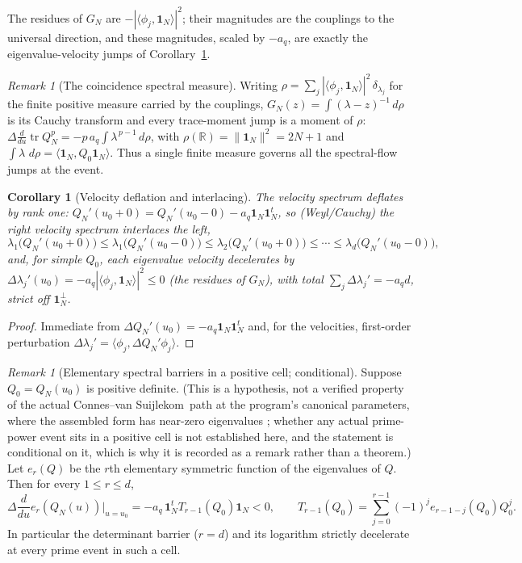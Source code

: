 \documentclass[11pt]{article}
\theoremstyle{plain}
\newtheorem{corollary}[theorem]{Corollary}
\theoremstyle{definition}
\theoremstyle{remark}
\newtheorem{remark}[theorem]{Remark}
\newcommand{\R}{\mathbb R}
\newcommand{\cvs}{Connes--van Suijlekom}
\newcommand{\dd}{\,d}
\newcommand{\one}{\mathbf 1}
\begin{document}
The residues of $G_N$ are $-|\langle\phi_j,\one_N\rangle|^2$; their magnitudes are
the couplings to the universal direction, and these magnitudes, scaled by
$-a_q$, are exactly
the eigenvalue-velocity jumps of Corollary~\ref{cor:deflation}.

\begin{remark}[The coincidence spectral measure]
Writing $\rho=\sum_j|\langle\phi_j,\one_N\rangle|^2\,\delta_{\lambda_j}$ for the
finite positive measure carried by the couplings, $G_N(z)=\int(\lambda-z)^{-1}\dd\rho$
is its Cauchy transform and every trace-moment jump is a moment of $\rho$:
$\Delta\frac{d}{du}\operatorname{tr}Q_N^p=-p\,a_q\int\lambda^{\,p-1}\dd\rho$, with
$\rho(\R)=\|\one_N\|^2=2N+1$ and $\int\lambda\,\dd\rho=\langle\one_N,Q_0\one_N\rangle$.
Thus a single finite measure governs all the spectral-flow jumps at the event.
\end{remark}

\begin{corollary}[Velocity deflation and interlacing]\label{cor:deflation}
The velocity spectrum deflates by rank one: $Q_N'(u_0{+}0)=Q_N'(u_0{-}0)
-a_q\one_N\one_N^t$, so (Weyl/Cauchy) the right velocity spectrum interlaces the
left,
\[
 \lambda_1\!\bigl(Q_N'(u_0{+}0)\bigr)\le\lambda_1\!\bigl(Q_N'(u_0{-}0)\bigr)
 \le\lambda_2\!\bigl(Q_N'(u_0{+}0)\bigr)\le\cdots
 \le\lambda_d\!\bigl(Q_N'(u_0{-}0)\bigr),
\]
and, for simple $Q_0$, each eigenvalue velocity decelerates by
$\Delta\lambda_j'(u_0)=-a_q|\langle\phi_j,\one_N\rangle|^2\le0$ (the residues of
$G_N$), with total $\sum_j\Delta\lambda_j'=-a_qd$, strict off
$\one_N^{\perp}$.
\end{corollary}

\begin{proof}
Immediate from $\Delta Q_N'(u_0)=-a_q\one_N\one_N^t$ and, for the velocities,
first-order perturbation $\Delta\lambda_j'=\langle\phi_j,\Delta Q_N'\phi_j\rangle$.
\end{proof}

\begin{remark}[Elementary spectral barriers in a positive cell; conditional]\label{thm:barriers}
Suppose $Q_0=Q_N(u_0)$ is positive definite. (This is a hypothesis, not a
verified property of the actual \cvs\ path at the program's canonical
parameters, where the assembled form has near-zero eigenvalues
\cite{Groskin2026Paper1}; whether any
actual prime-power event sits in a positive cell is not established here, and
the statement is conditional on it, which is why it is recorded as a remark
rather than a theorem.) Let $e_r(Q)$ be the $r$th elementary
symmetric function of the eigenvalues of $Q$. Then for every $1\le r\le d$,
\[
        \Delta\frac{d}{du}e_r(Q_N(u))\Big|_{u=u_0}
        =-a_q\,\one_N^tT_{r-1}(Q_0)\one_N<0,\qquad
        T_{r-1}(Q_0)=\sum_{j=0}^{r-1}(-1)^je_{r-1-j}(Q_0)Q_0^j .
\]
In particular the determinant barrier ($r=d$) and its logarithm strictly
decelerate at every prime event in such a cell.
\end{remark}
\end{document}
